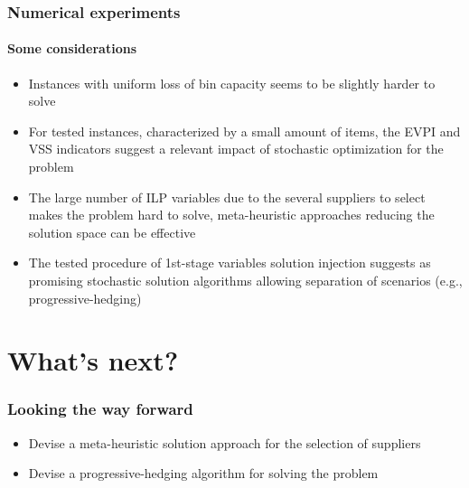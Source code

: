 \documentclass[9pt,xcolor={dvipsnames}]{beamer}
\begin{document}
\begin{frame}%
	\frametitle{Numerical experiments}
	\framesubtitle{Some considerations}	
	\begin{itemize}
		\item<1-> Instances with uniform loss of bin capacity seems to be slightly harder to solve
		\bigskip
		\item<2-> For tested instances, characterized by a small amount of items, the EVPI and VSS indicators suggest a relevant impact of stochastic optimization for the problem
		\bigskip
		\item<3-> The large number of ILP variables due to the several suppliers to select makes the problem hard to solve, meta-heuristic approaches reducing the solution space can be effective
		\bigskip
		\item<4-> The tested procedure of 1st-stage variables solution injection suggests as promising stochastic solution algorithms allowing separation of scenarios (e.g., progressive-hedging)
	\end{itemize}
\end{frame}

\section {What's next?}
\begin{frame}%
	\frametitle{Looking the way forward}
	\begin{itemize}
		\item<1-> Devise a meta-heuristic solution approach for the selection of suppliers 
		\bigskip
		\item<2-> Devise a progressive-hedging algorithm for solving the problem
	\end{itemize}
\end{frame}
\end{document}

